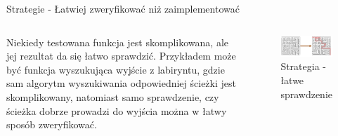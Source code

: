 \begin{frame}{Strategie - Łatwiej zweryfikować niż zaimplementować}
    \begin{columns}[t]
            Niekiedy testowana funkcja jest skomplikowana, ale jej rezultat da się łatwo sprawdzić. Przykładem może być funkcja wyszukująca wyjście z labiryntu, gdzie sam algorytm wyszukiwania odpowiedniej ścieżki jest skomplikowany, 
            natomiast samo sprawdzenie, czy ścieżka dobrze prowadzi do wyjścia można w łatwy sposób zweryfikować.
        \centering
        \begin{figure}
            \centering
            \includegraphics[width=1\textwidth]{images/property_easy_verification.png}
            \caption{Strategia - łatwe sprawdzenie}
            \label{fig:easy_verification_strategy}
        \end{figure}    
    \end{columns}
\end{frame}


